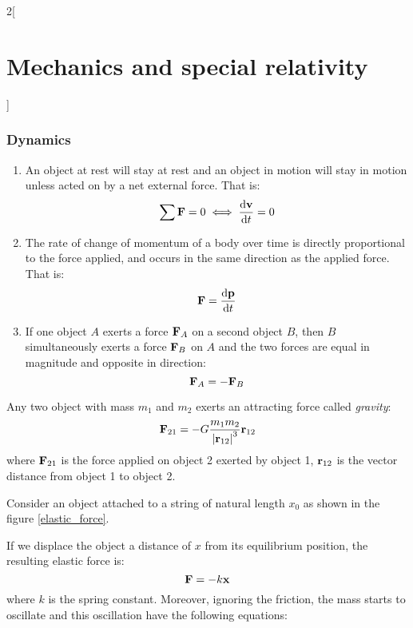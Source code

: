 \documentclass[../../../main.tex]{subfiles}
\begin{document}
\begin{multicols}{2}[\section{Mechanics and special relativity}]
    \subsubsection*{Dynamics}
    \begin{law}
        \hfill
        \begin{enumerate}
            \item An object at rest will stay at rest and an object in motion will stay in motion unless acted on by a net external force. That is: $$\sum\boldsymbol{\mathrm{F}}=0\iff\dv{\boldsymbol{\mathrm{v}}}{t}=0$$
            \item The rate of change of momentum of a body over time is directly proportional to the force applied, and occurs in the same direction as the applied force. That is: $$\boldsymbol{\mathrm{F}}=\dv{\boldsymbol{\mathrm{p}}}{t}$$
            \item If one object $A$ exerts a force $\boldsymbol{\mathrm{F}}_A$ on a second object $B$, then $B$ simultaneously exerts a force $\boldsymbol{\mathrm{F}}_B$ on $A$ and the two forces are equal in magnitude and opposite in direction: $$\boldsymbol{\mathrm{F}}_A=-\boldsymbol{\mathrm{F}}_B$$
        \end{enumerate}
    \end{law}
    \begin{prop}
        Any two object with mass $m_1$ and $m_2$ exerts an attracting force called \textit{gravity}:
        $$\boldsymbol{\mathrm{F}}_{21}=-G\frac{m_1m_2}{{|\boldsymbol{\mathrm{r}}_{12}|}^3}\boldsymbol{\mathrm{r}}_{12}$$
        where $\boldsymbol{\mathrm{F}}_{21}$ is the force applied on object 2 exerted by object 1, $\boldsymbol{\mathrm{r}}_{12}$ is the vector distance from object 1 to object 2.
    \end{prop}
    \begin{prop}
        Consider an object attached to a string of natural length $x_0$ as shown in the figure \ref{elastic_force}.
        \begin{center}
            \begin{minipage}{\linewidth}
                \centering
                
                \label{elastic_force}
            \end{minipage}
        \end{center}
        If we displace the object a distance of $x$ from its equilibrium position, the resulting elastic force is: $$\boldsymbol{\mathrm{F}}=-k\boldsymbol{\mathrm{x}}$$ where $k$ is the spring constant. Moreover, ignoring the friction, the mass starts to oscillate and this oscillation have the following equations:

\end{prop}
\end{multicols}
\end{document}
